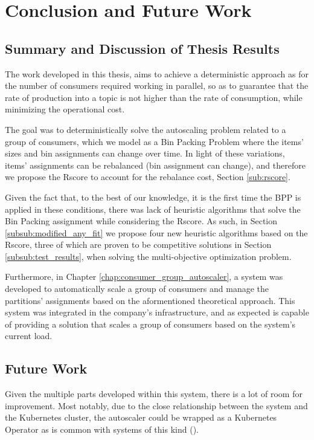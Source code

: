 \chapter{Conclusion and Future Work} 
\label{chap:conclusions}

\section{Summary and Discussion of Thesis Results}

The work developed in this thesis, aims to achieve a deterministic approach as
for the number of consumers required working in parallel, so as to guarantee
that the rate of production into a topic is not higher than the rate of
consumption, while minimizing the operational cost.

The goal was to deterministically solve the autoscaling problem related to a
group of consumers, which we model as a Bin Packing Problem where the items'
sizes and bin assignments can change over time. In light of these variations,
items' assignments can be rebalanced (bin assignment can change), and therefore
we propose the Rscore to account for the rebalance cost, Section
\ref{sub:rscore}.

Given the fact that, to the best of our knowledge, it is the first time the BPP
is applied in these conditions, there was lack of heuristic algorithms that
solve the Bin Packing assignment while considering the Rscore. As such, in
Section \ref{subsub:modified_any_fit} we propose four new heuristic algorithms
based on the Rscore, three of which are proven to be competitive solutions in
Section \ref{subsub:test_results}, when solving the multi-objective optimization
problem.

Furthermore, in Chapter \ref{chap:consumer_group_autoscaler}, a system was
developed to automatically scale a group of consumers and manage the partitions'
assignments based on the aformentioned theoretical approach. This system was
integrated in the company's infrastructure, and as expected is capable of
providing a solution that scales a group of consumers based on the system's
current load.

\section{Future Work}

Given the multiple parts developed within this system, there is a lot of room
for improvement. Most notably, due to the close relationship between the system
and the Kubernetes cluster, the autoscaler could be wrapped as a Kubernetes
Operator \cite{KuberenetesOperator} as is common with systems of this kind
(\cite{Kubegres, PulumiOperator, KEDA}).

